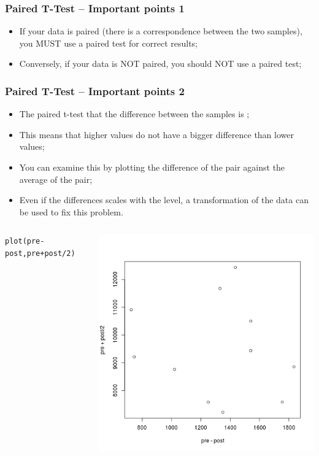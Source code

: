 \documentclass[10pt]{beamer}
\begin{document}
\begin{frame}
  \frametitle{Paired T-Test -- Important points 1}
  \begin{itemize}
  \item If your data is paired (there is a correspondence between the
    two samples), you MUST use a paired test for correct results;
  \item Conversely, if your data is NOT paired, you should NOT use a
    paired test;
  \end{itemize}
\end{frame}

\begin{frame}
  \frametitle{Paired T-Test -- Important points 2}
  \begin{itemize}
  \item The paired t-test  that the difference between the
    samples is ;
  \item This means that higher values do not have a bigger difference
    than lower values;
  \item You can examine this by plotting the difference of the pair
    against the average of the pair;
  \item Even if the differences scales with the level, a
    transformation of the data can be used to fix this problem.
  \end{itemize}
\begin{columns}[c]
\begin{verbatim}
plot(pre-post,pre+post/2)
\end{verbatim}
\hfill \includegraphics[width=1\textwidth]{img/bland_altman}
\end{columns}
\end{frame}
\end{document}
